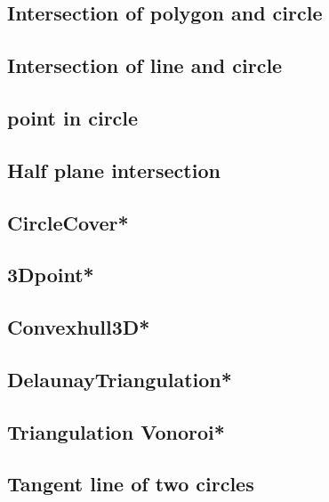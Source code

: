 \subsection{Intersection of polygon and circle}

\subsection{Intersection of line and circle}

\subsection{point in circle}

\subsection{Half plane intersection}

\subsection{CircleCover*} %

\subsection{3Dpoint*} %

\subsection{Convexhull3D*} %

\subsection{DelaunayTriangulation*} %

\subsection{Triangulation Vonoroi*} %

\subsection{Tangent line of two circles}

